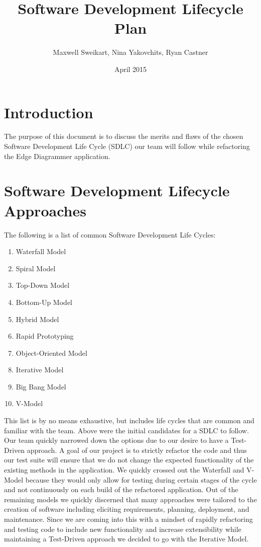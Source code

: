 \documentclass{article}
\title{Software Development Lifecycle Plan}
\author{Maxwell Sweikart, Nina Yakovchits, Ryan Castner}
\date{April 2015}
\begin{document}
\maketitle

\section{Introduction}
The purpose of this document is to discuss the merits and flaws of the chosen Software Development Life Cycle (SDLC) our team will follow while refactoring the Edge Diagrammer application.
\hfill \\

\section{Software Development Lifecycle Approaches}
The following is a list of common Software Development Life Cycles: \hfill \\
\begin{enumerate}
\item Waterfall Model
\item Spiral Model
\item Top-Down Model
\item Bottom-Up Model
\item Hybrid Model
\item Rapid Prototyping
\item Object-Oriented Model
\item Iterative Model
\item Big Bang Model
\item V-Model
\end{enumerate}

This list is by no means exhaustive, but includes life cycles that are common and familiar with the team. Above were the initial candidates for a SDLC to follow. Our team quickly narrowed down the options due to our desire to have a Test-Driven approach. A goal of our project is to strictly refactor the code and thus our test suite will ensure that we do not change the expected functionality of the existing methods in the application. We quickly crossed out the Waterfall and V-Model because they would only allow for testing during certain stages of the cycle and not continuously on each build of the refactored application. Out of the remaining models we quickly discerned that many approaches were tailored to the creation of software including eliciting requirements, planning, deployment, and maintenance. Since we are coming into this with a mindset of rapidly refactoring and testing code to include new functionality and increase extensibility while maintaining a Test-Driven approach we decided to go with the Iterative Model. \hfill \\
\end{document}
